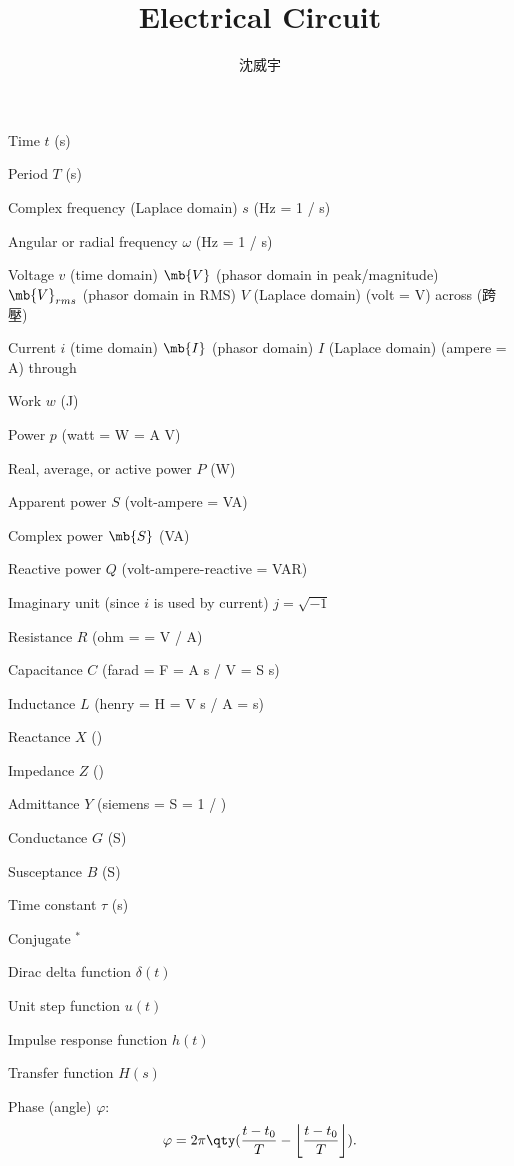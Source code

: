 \documentclass[a4paper,12pt]{article}
\begin{document}
\title{Electrical Circuit}
\author{沈威宇}
\date{\temtoday}
\titletocdoc
{}
\bit
\item Time $t$ (s)
\item Period $T$ (s)
\item Complex frequency (Laplace domain) $s$ (Hz = 1 / s)
\item Angular or radial frequency $\omega$ (Hz = 1 / s)
\item Voltage $v$ (time domain) $\mb{V}$ (phasor domain in peak/magnitude) $\mb{V}_{rms}$ (phasor domain in RMS) $V$ (Laplace domain) (volt = V) across (跨壓)
\item Current $i$ (time domain) $\mb{I}$ (phasor domain) $I$ (Laplace domain) (ampere = A) through
\item Work $w$ (J)
\item Power $p$ (watt = W = A V)
\item Real, average, or active power $P$ (W)
\item Apparent power $S$ (volt-ampere = VA)
\item Complex power $\mb{S}$ (VA)
\item Reactive power $Q$ (volt-ampere-reactive = VAR)
\item Imaginary unit (since $i$ is used by current) $j=\sqrt{-1}$
\item Resistance $R$ (ohm = \textOmega = V / A)
\item Capacitance $C$ (farad = F = A s / V = S s)
\item Inductance $L$ (henry = H = V s / A = \textOmega s)
\item Reactance $X$ (\textOmega)
\item Impedance $Z$ (\textOmega)
\item Admittance $Y$ (siemens = S = 1 / \textOmega)
\item Conductance $G$ (S)
\item Susceptance $B$ (S)
\item Time constant $\tau$ (s)
\item Conjugate $^*$
\item Dirac delta function $\delta(t)$
\item Unit step function $u(t)$
\item Impulse response function $h(t)$
\item Transfer function $H(s)$
\item Phase (angle) $\varphi$:
\[\varphi=2\pi\qty(\frac{t-t_0}{T}-\left\lfloor\frac{t-t_0}{T}\right\rfloor).\]
\eit
\end{document}
